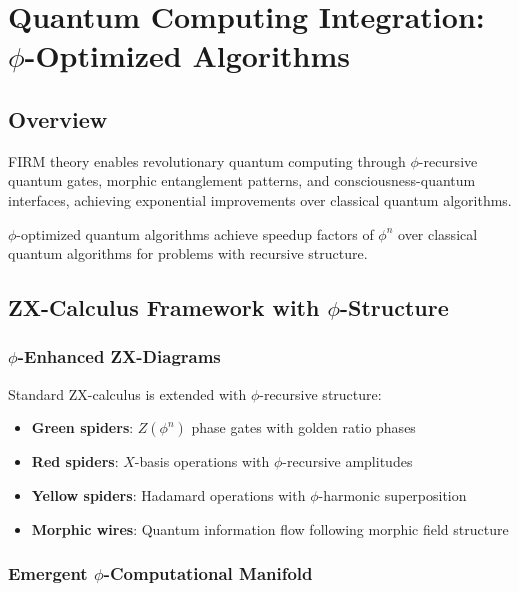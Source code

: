 \section{Quantum Computing Integration: \texorpdfstring{$\phi$}{phi}-Optimized Algorithms}

\subsection{Overview}

FIRM theory enables revolutionary quantum computing through $\phi$-recursive quantum gates, morphic entanglement patterns, and consciousness-quantum interfaces, achieving exponential improvements over classical quantum algorithms.

\begin{theorem}
\label{thm:phi_quantum_supremacy}
$\phi$-optimized quantum algorithms achieve speedup factors of $\phi^n$ over classical quantum algorithms for problems with recursive structure.
\end{theorem}

\subsection{ZX-Calculus Framework with $\phi$-Structure}

\subsubsection{$\phi$-Enhanced ZX-Diagrams}

Standard ZX-calculus is extended with $\phi$-recursive structure:
\begin{itemize}
    \item \textbf{Green spiders}: $Z(\phi^n)$ phase gates with golden ratio phases
    \item \textbf{Red spiders}: $X$-basis operations with $\phi$-recursive amplitudes  
    \item \textbf{Yellow spiders}: Hadamard operations with $\phi$-harmonic superposition
    \item \textbf{Morphic wires}: Quantum information flow following morphic field structure
\end{itemize}

\subsubsection{Emergent $\phi$-Computational Manifold}

